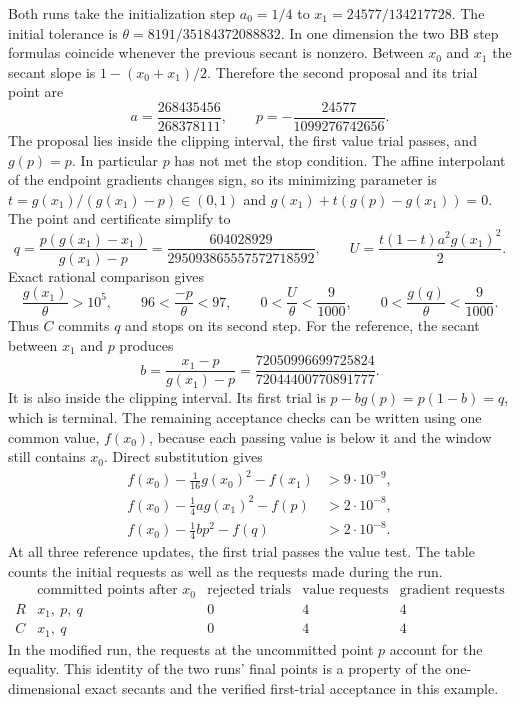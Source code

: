 \documentclass[11pt]{article}
\begin{document}
Both runs take the initialization step \(a_0=1/4\) to
\(x_1=24577/134217728\). The initial tolerance is
\(\theta=8191/35184372088832\). In one dimension the two BB
step formulas coincide whenever the previous secant is nonzero.
Between \(x_0\) and \(x_1\) the secant slope is
\(1-(x_0+x_1)/2\). Therefore the second proposal and its trial
point are
\[
 a=\frac{268435456}{268378111},\qquad
 p=-\frac{24577}{1099276742656}.
\]
The proposal lies inside the clipping interval, the first value
trial passes, and \(g(p)=p\). In particular \(p\) has not met
the stop condition. The affine interpolant of the endpoint gradients changes
sign, so its minimizing parameter is
\(t=g(x_1)/(g(x_1)-p)\in(0,1)\) and \(g(x_1)+t(g(p)-g(x_1))=0\).
The point and certificate simplify to
\begin{equation}
 q=\frac{p(g(x_1)-x_1)}{g(x_1)-p}
   =\frac{604028929}{295093865557572718592},
 \qquad U=\frac{t(1-t)a^2g(x_1)^2}{2}.
 \label{eq:explicitq}
\end{equation}
Exact rational comparison gives
\[
 \frac{g(x_1)}{\theta}>10^5,\qquad
 96<\frac{-p}{\theta}<97,\qquad
 0<\frac{U}{\theta}<\frac9{1000},\qquad
 0<\frac{g(q)}{\theta}<\frac9{1000}.
\]
Thus \(C\) commits \(q\) and stops on its second step. For the
reference, the secant between \(x_1\) and \(p\) produces
\[
 b=\frac{x_1-p}{g(x_1)-p}
   =\frac{72050996699725824}{72044400770891777}.
\]
It is also inside the clipping interval. Its first trial is
\(p-bg(p)=p(1-b)=q\), which is terminal. The remaining acceptance
checks can be written using one common value, \(f(x_0)\), because
each passing value is below it and the window still contains
\(x_0\). Direct substitution gives
\begin{align*}
 f(x_0)-\tfrac1{16}g(x_0)^2-f(x_1)&>9\cdot10^{-9},\\
 f(x_0)-\tfrac14 a g(x_1)^2-f(p)&>2\cdot10^{-8},\\
 f(x_0)-\tfrac14 b p^2-f(q)&>2\cdot10^{-8}.
\end{align*}
At all three reference updates, the first trial passes the value
test. The table counts the initial requests as well as the requests
made during the run.
\[
\begin{array}{c|c|c|c|c}
  &\text{committed points after }x_0 &\text{rejected trials}
           &\text{value requests}&\text{gradient requests}\\ \hline
 R &x_1,\ p,\ q &0&4&4\\
 C &x_1,\ q     &0&4&4
\end{array}
\]
In the modified run, the requests at the uncommitted point \(p\)
account for the equality. This identity of the two runs' final
points is a property of the one-dimensional exact secants and
the verified first-trial acceptance in this example.
\end{document}
